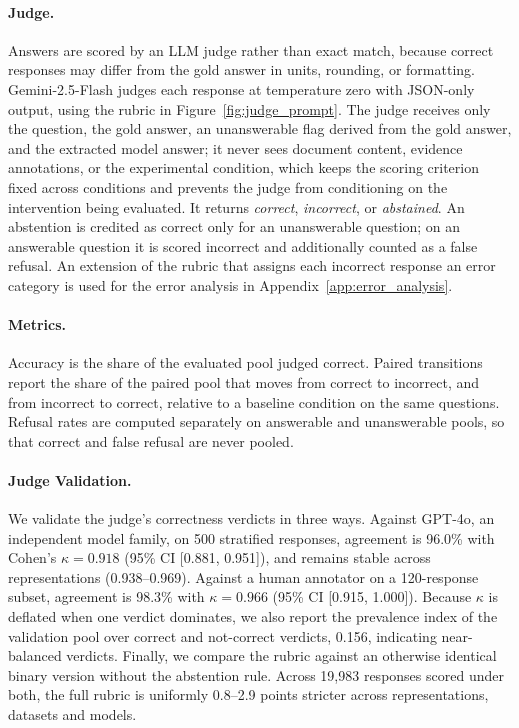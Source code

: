 \paragraph{Judge.}
Answers are scored by an LLM judge rather than exact match, because correct responses may differ from the gold answer in units, rounding, or formatting. Gemini-2.5-Flash judges each response at temperature zero with JSON-only output, using the rubric in Figure~\ref{fig:judge_prompt}. The judge receives only the question, the gold answer, an unanswerable flag derived from the gold answer, and the extracted model answer; it never sees document content, evidence annotations, or the experimental condition, which keeps the scoring criterion fixed across conditions and prevents the judge from conditioning on the intervention being evaluated. It returns \emph{correct}, \emph{incorrect}, or \emph{abstained}. An abstention is credited as correct only for an unanswerable question; on an answerable question it is scored incorrect and additionally counted as a false refusal. An extension of the rubric that assigns each incorrect response an error category is used for the error analysis in Appendix~\ref{app:error_analysis}.



\paragraph{Metrics.}
Accuracy is the share of the evaluated pool judged correct. Paired transitions report the share of the paired pool that moves from correct to incorrect, and from incorrect to correct, relative to a baseline condition on the same questions. Refusal rates are computed separately on answerable and unanswerable pools, so that correct and false refusal are never pooled.

\paragraph{Judge Validation.}
We validate the judge's correctness verdicts in three ways. Against GPT-4o, an independent model family, on 500 stratified responses, agreement is 96.0\% with Cohen's $\kappa = 0.918$ (95\% CI [0.881, 0.951]), and remains stable across representations (0.938--0.969). Against a human annotator on a 120-response subset, agreement is 98.3\% with $\kappa = 0.966$ (95\% CI [0.915, 1.000]). Because $\kappa$ is deflated when one verdict dominates, we also report the prevalence index of the validation pool over correct and not-correct verdicts, 0.156, indicating near-balanced verdicts. Finally, we compare the rubric against an otherwise identical binary version without the abstention rule. Across 19,983 responses scored under both, the full rubric is uniformly 0.8--2.9 points stricter across representations, datasets and models.

